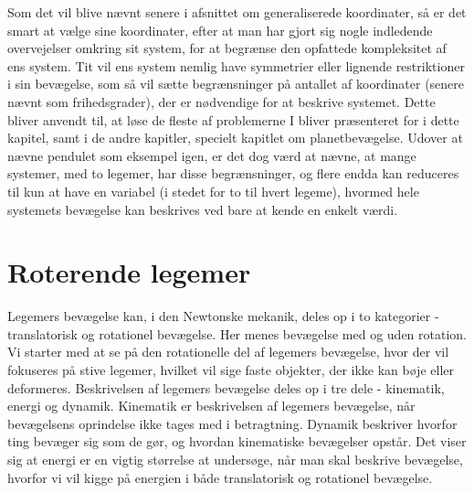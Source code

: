 Som det vil blive nævnt senere i afsnittet om generaliserede koordinater, så er det smart at vælge sine koordinater, efter at man har gjort sig nogle indledende overvejelser omkring sit system, for at begrænse den opfattede kompleksitet af ens system. Tit vil ens system nemlig have symmetrier eller lignende restriktioner i sin bevægelse, som så vil sætte begrænsninger på antallet af koordinater (senere nævnt som frihedsgrader), der er nødvendige for at beskrive systemet. Dette bliver anvendt til, at løse de fleste af problemerne I bliver præsenteret for i dette kapitel, samt i de andre kapitler, specielt kapitlet om planetbevægelse. Udover at nævne pendulet som eksempel igen, er det dog værd at nævne, at mange systemer, med to legemer, har disse begrænsninger, og flere endda kan reduceres til kun at have en variabel (i stedet for to til hvert legeme), hvormed hele systemets bevægelse kan beskrives ved bare at kende en enkelt værdi.

\section{Roterende legemer}
Legemers bevægelse kan, i den Newtonske mekanik, deles op i to kategorier - translatorisk og rotationel bevægelse. Her menes bevægelse med og uden rotation. Vi starter med at se på den rotationelle del af legemers bevægelse, hvor der vil fokuseres på stive legemer, hvilket vil sige faste objekter, der ikke kan bøje eller deformeres. Beskrivelsen af legemers bevægelse deles op i tre dele - kinematik, energi og dynamik. Kinematik er beskrivelsen af legemers bevægelse, når bevægelsens oprindelse ikke tages med i betragtning. Dynamik beskriver hvorfor ting bevæger sig som de gør, og hvordan kinematiske bevægelser opstår. Det viser sig at energi er en vigtig størrelse at undersøge, når man skal beskrive bevægelse, hvorfor vi vil kigge på energien i både translatorisk og rotationel bevægelse.

